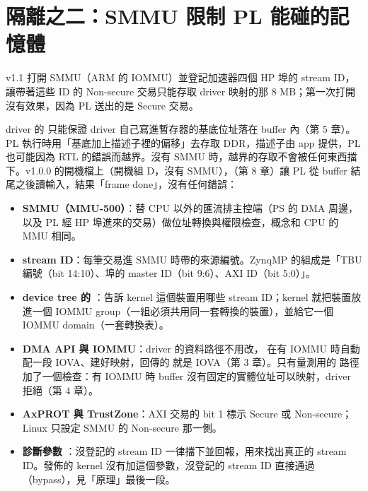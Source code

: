 \section{隔離之二：SMMU 限制 PL 能碰的記憶體}
\label{sec:smmu}

\begin{oneline}
v1.1 打開 SMMU（ARM 的 IOMMU）並登記加速器四個 HP 埠的 stream ID，讓帶著這些 ID 的 Non-secure 交易只能存取 driver 映射的那 8 MB；第一次打開沒有效果，因為 PL 送出的是 Secure 交易。
\end{oneline}

\begin{before}
driver 的  只能保證 driver 自己寫進暫存器的基底位址落在 buffer 內（第 5 章）。PL 執行時用「基底加上描述子裡的偏移」去存取 DDR，描述子由 app 提供，PL 也可能因為 RTL 的錯誤而越界。沒有 SMMU 時，越界的存取不會被任何東西擋下。v1.0.0 的開機檔上（開機組 D，沒有 SMMU），（第 8 章）讓 PL 從 buffer 結尾之後讀輸入，結果「frame done」，沒有任何錯誤：

\end{before}

\begin{tech}
\begin{itemize}
\item \textbf{SMMU（MMU-500）}：替 CPU 以外的匯流排主控端（PS 的 DMA 周邊，以及 PL 經 HP 埠進來的交易）做位址轉換與權限檢查，概念和 CPU 的 MMU 相同。
\item \textbf{stream ID}：每筆交易進 SMMU 時帶的來源編號。ZynqMP 的組成是「TBU 編號（bit 14:10）、埠的 master ID（bit 9:6）、AXI ID（bit 5:0）」。
\item \textbf{device tree 的 }：告訴 kernel 這個裝置用哪些 stream ID；kernel 就把裝置放進一個 IOMMU group（一組必須共用同一套轉換的裝置），並給它一個 IOMMU domain（一套轉換表）。
\item \textbf{DMA API 與 IOMMU}：driver 的資料路徑不用改， 在有 IOMMU 時自動配一段 IOVA、建好映射，回傳的  就是 IOVA（第 3 章）。只有量測用的  路徑加了一個檢查：有 IOMMU 時 buffer 沒有固定的實體位址可以映射，driver 拒絕（第 4 章）。
\item \textbf{AxPROT 與 TrustZone}：AXI 交易的 bit 1 標示 Secure 或 Non-secure；Linux 只設定 SMMU 的 Non-secure 那一側。
\item \textbf{診斷參數 }：沒登記的 stream ID 一律擋下並回報，用來找出真正的 stream ID。發佈的 kernel 沒有加這個參數，沒登記的 stream ID 直接通過（bypass），見「原理」最後一段。
\end{itemize}
\end{tech}

